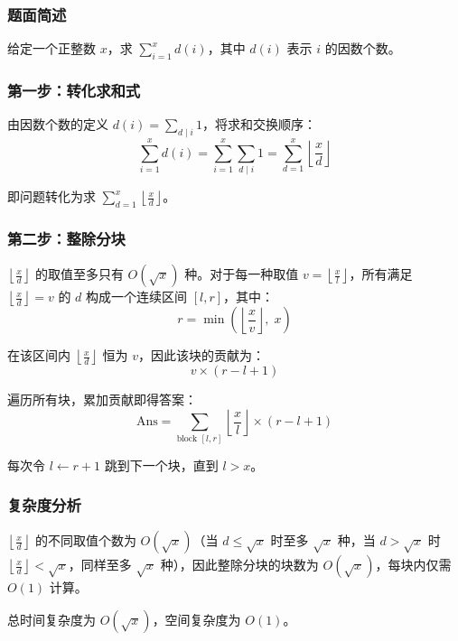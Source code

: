 \documentclass[11pt,a4paper,twocolumn]{ctexart}  %
\begin{document}
\subsubsection*{题面简述}

给定一个正整数 $x$，求 $\sum_{i=1}^{x} d(i)$，其中 $d(i)$ 表示 $i$ 的因数个数。


\subsubsection*{第一步：转化求和式}

由因数个数的定义 $d(i) = \sum_{d \mid i} 1$，将求和交换顺序：
\[
    \sum_{i=1}^{x} d(i) = \sum_{i=1}^{x} \sum_{d \mid i} 1 = \sum_{d=1}^{x} \left\lfloor \frac{x}{d} \right\rfloor
\]

即问题转化为求 $\sum_{d=1}^{x} \left\lfloor \frac{x}{d} \right\rfloor$。

\subsubsection*{第二步：整除分块}

$\left\lfloor \frac{x}{d} \right\rfloor$ 的取值至多只有 $O(\sqrt{x})$ 种。对于每一种取值 $v = \left\lfloor \frac{x}{l} \right\rfloor$，所有满足 $\left\lfloor \frac{x}{d} \right\rfloor = v$ 的 $d$ 构成一个连续区间 $[l, r]$，其中：
\[
    r = \min\!\left(\left\lfloor \frac{x}{v} \right\rfloor,\; x\right)
\]

在该区间内 $\left\lfloor \frac{x}{d} \right\rfloor$ 恒为 $v$，因此该块的贡献为：
\[
    v \times (r - l + 1)
\]

遍历所有块，累加贡献即得答案：
\[
    \mathrm{Ans} = \sum_{\text{block } [l,r]} \left\lfloor \frac{x}{l} \right\rfloor \times (r - l + 1)
\]

每次令 $l \leftarrow r + 1$ 跳到下一个块，直到 $l > x$。

\subsubsection*{复杂度分析}

$\left\lfloor \frac{x}{d} \right\rfloor$ 的不同取值个数为 $O(\sqrt{x})$（当 $d \le \sqrt{x}$ 时至多 $\sqrt{x}$ 种，当 $d > \sqrt{x}$ 时 $\left\lfloor \frac{x}{d} \right\rfloor < \sqrt{x}$，同样至多 $\sqrt{x}$ 种），因此整除分块的块数为 $O(\sqrt{x})$，每块内仅需 $O(1)$ 计算。

总时间复杂度为 $O(\sqrt{x})$，空间复杂度为 $O(1)$。

\end{document}
